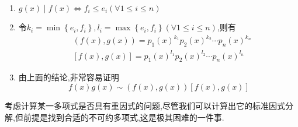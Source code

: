 \begin{green}
\begin{corollary}[公共因式分解的若干结论]\label{cor:公共因式分解的若干结论}
    \,

    \begin{enumerate}[label={\textup{(\arabic*)}}]
        \item $g\left(x\right)\mid f\left(x\right)\Longleftrightarrow f_i\leqslant e_i\left(\forall 1\leqslant i\leqslant 
        n\right)$
        \item 令$k_i=\min\left\{e_i,f_i\right\},l_i=\max\left\{e_i,f_i\right\}\left(\forall 1\leqslant i\leqslant n\right)$,则有
        \begin{align*}
            &\left(f\left(x\right),g\left(x\right)\right)=p_1\left(x\right)^{k_1}p_2\left(x\right)^{k_2}\cdots p_n\left(x\right)^{k_n}\\
            &\left[f\left(x\right),g\left(x\right)\right]=p_1\left(x\right)^{l_1}p_2\left(x\right)^{l_2}\cdots p_n\left(x\right)^{l_n}
        \end{align*}
        \item 由上面的结论,非常容易证明
        \[f\left(x\right)g\left(x\right)\sim \left(f\left(x\right),g\left(x\right)\right)\left[f\left(x\right),g\left(x\right)\right]\]
    \end{enumerate}
\end{corollary}
\end{green}
\begin{red}
\begin{remark}
    考虑计算某一多项式是否具有重因式的问题,尽管我们可以计算出它的标准因式分解,但前提是找到合适的不可约多项式,这是极其困难的一件事.
\end{remark}
\end{red}
